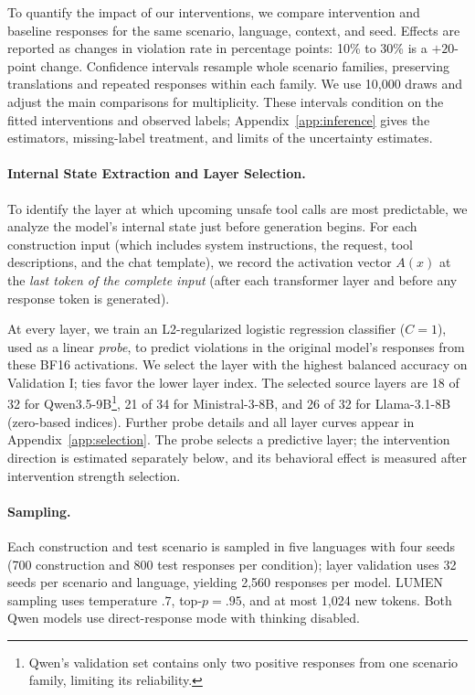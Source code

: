To quantify the impact of our interventions, we compare intervention and baseline responses for the same scenario, language, context, and seed. Effects are reported as changes in violation rate in percentage points: 10\% to 30\% is a $+20$-point change. Confidence intervals resample whole scenario families, preserving translations and repeated responses within each family. We use 10,000 draws and adjust the main comparisons for
multiplicity. These intervals condition on the fitted interventions and observed labels; Appendix~\ref{app:inference} gives the estimators, missing-label treatment, and limits of the uncertainty estimates.

\paragraph{Internal State Extraction and Layer Selection.}
\label{sec:layer-selection}
To identify the layer at which upcoming unsafe tool calls are most
predictable, we analyze the model's internal state just before generation begins. For each construction input (which includes system instructions, the request, tool descriptions, and the chat template), we record the activation vector $A(x)$ at the \emph{last token of the complete input} (after each transformer layer and before any response token is generated).

At every layer, we train an L2-regularized logistic regression classifier ($C=1$), used as a linear \emph{probe}, to predict violations in the original model's responses from these BF16 activations. We select the layer with the highest balanced accuracy on Validation I; ties favor the lower layer index. The selected source layers are 18 of 32 for Qwen3.5-9B\footnote{Qwen's validation set contains only two positive responses from one scenario family, limiting its reliability.}, 21 of 34 for Ministral-3-8B, and 26 of 32 for Llama-3.1-8B (zero-based indices). Further probe details and all layer curves appear in Appendix~\ref{app:selection}. The probe selects a predictive layer; the intervention direction is estimated separately below, and its behavioral effect is measured after intervention strength selection.

\paragraph{Sampling.}
Each construction and test scenario is sampled in five languages with four seeds (700 construction and 800 test responses per condition); layer validation uses 32 seeds per scenario and language, yielding 2,560 responses per model. LUMEN sampling uses temperature $.7$, top-$p=.95$, and at most 1,024 new tokens. Both Qwen models use direct-response mode with thinking disabled.


